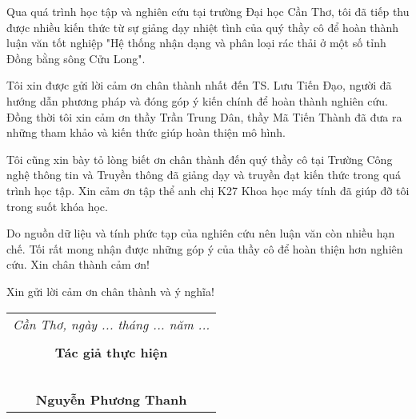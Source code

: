 \documentclass[./thesis.tex]{subfiles}
\begin{document}
{\fontsize{13}{12} \selectfont
Qua quá trình học tập và nghiên cứu tại trường Đại học Cần Thơ, tôi đã tiếp thu được nhiều kiến thức từ sự giảng dạy nhiệt tình của quý thầy cô để hoàn thành luận văn tốt nghiệp "Hệ thống nhận dạng và phân loại rác thải ở một số tỉnh Đồng bằng sông Cửu Long". 

Tôi xin được gửi lời cảm ơn chân thành nhất đến TS. Lưu Tiến Đạo, người đã hướng dẫn phương pháp và đóng góp ý kiến chính để hoàn thành nghiên cứu.
Đồng thời tôi xin cảm ơn thầy Trần Trung Dân, thầy Mã Tiến Thành đã đưa ra những tham khảo và kiến thức giúp hoàn thiện mô hình.

Tôi cũng xin bày tỏ lòng biết ơn chân thành đến quý thầy cô tại Trường Công nghệ thông tin và Truyền thông đã giảng dạy và truyền đạt kiến thức trong quá trình học tập. Xin cảm ơn tập thể anh chị K27 Khoa học máy tính đã giúp đỡ tôi trong suốt khóa học.

Do nguồn dữ liệu và tính phức tạp của nghiên cứu nên luận văn còn nhiều hạn chế. Tối rất mong nhận được những góp ý của thầy cô để hoàn thiện hơn nghiên cứu.
Xin chân thành cảm ơn!

}

{\fontsize{13}{12} \selectfont
Xin gửi lời cảm ơn chân thành và ý nghĩa!
}

{\fontsize{13}{12} \selectfont
\hspace*{\fill}
\begin{tabular}{@{}c@{}} 

\\ \textit{Cần Thơ, ngày ... tháng ... năm ... } \\ \\
\textbf{Tác giả thực hiện}\\ \\
\\
\\
\\
\\
\textbf{Nguyễn Phương Thanh}
\end{tabular}}
\end{document}
